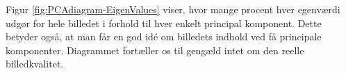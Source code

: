 %



Figur \ref{fig:PCAdiagram-EigenValues} viser, hvor mange procent hver egenværdi udgør for hele billedet i forhold til hver enkelt principal komponent. Dette betyder også, at man får en god idé om billedets indhold ved få principale komponenter. Diagrammet fortæller os til gengæld intet om den reelle billedkvalitet.

